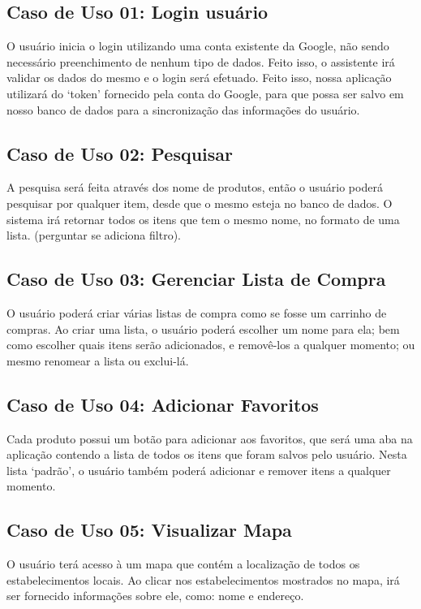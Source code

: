 \subsection{Caso de Uso 01: Login usuário}

O usuário inicia o login utilizando uma conta existente da Google, não sendo necessário preenchimento de nenhum tipo de dados. Feito isso, o assistente irá validar os dados do mesmo e o login será efetuado. Feito isso, nossa aplicação utilizará do ‘token’ fornecido pela conta do Google, para que possa ser salvo em nosso banco de dados para a sincronização das informações do usuário.

\subsection{Caso de Uso 02: Pesquisar}

A pesquisa será feita através dos nome de produtos, então o usuário poderá pesquisar por qualquer item, desde que o mesmo esteja no banco de dados. O sistema irá retornar todos os itens que tem o mesmo nome, no formato de uma lista. (perguntar se adiciona filtro).

\subsection{Caso de Uso 03: Gerenciar Lista de Compra}

O usuário poderá criar várias listas de compra como se fosse um carrinho de compras. Ao criar uma lista, o usuário poderá escolher um nome para ela; bem como escolher quais itens serão adicionados, e removê-los a qualquer momento; ou mesmo renomear a lista ou exclui-lá.

\subsection{Caso de Uso 04: Adicionar Favoritos}

Cada produto possui um botão para adicionar aos favoritos, que será uma aba na aplicação contendo a lista de todos os itens que foram salvos pelo usuário. Nesta lista ‘padrão’, o usuário também poderá adicionar e remover itens a qualquer momento.

\subsection{Caso de Uso 05: Visualizar Mapa}

O usuário terá acesso à um mapa que contém a localização de todos os estabelecimentos locais. Ao clicar nos estabelecimentos mostrados no mapa, irá ser fornecido informações sobre ele, como: nome e endereço.